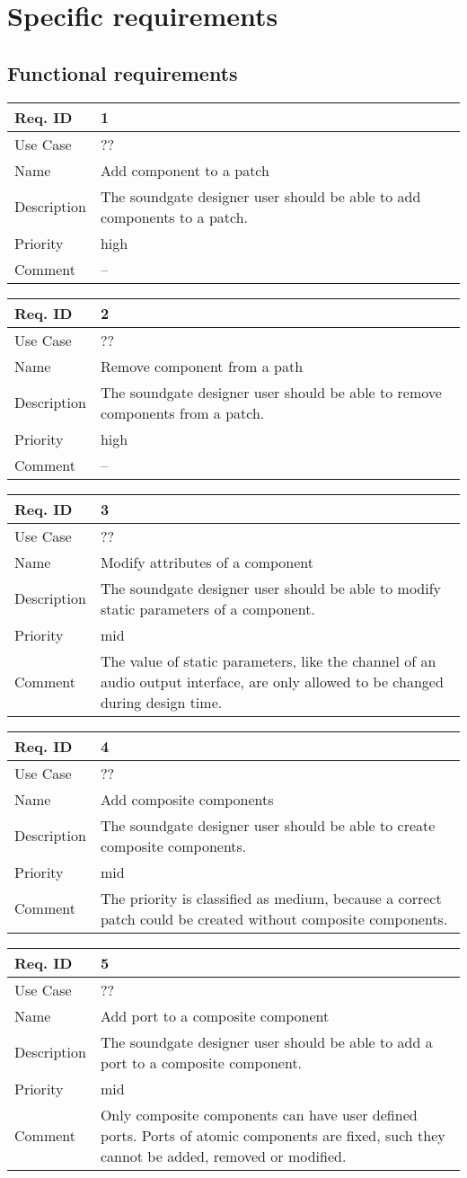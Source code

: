 \chapter{Specific requirements}

\newcommand{\funcRequirement}[6]{
\begin{center}
\begin{tabular}{|l|p{12cm}|}
\hline
Req. ID 		& #1 \\ \hline
Use Case 		& #2 \\ \hline
Name 				& #3 \\ \hline
Description & #4 \\ \hline
Priority 		& #5 \\ \hline
Comment 		& #6 \\ \hline
\end{tabular}
\end{center}
}


	\section{Functional requirements}
	

	\funcRequirement{1}
	{??}
	{Add component to a patch}
	{The soundgate designer user should be able to add components to a patch.}
	{high}
	{--}
  \funcRequirement{2}
	{??}
	{Remove component from a path}
	{The soundgate designer user should be able to remove components from a patch.}
	{high}
	{--}
  \funcRequirement{3}
	{??}
	{Modify attributes of a component}
	{The soundgate designer user should be able to modify static parameters of a component.}
	{mid}
	{The value of static parameters, like the channel of an audio output interface, are only allowed to be changed during design time.}
	
	\funcRequirement{4}
	{??}
	{Add composite components}
	{The soundgate designer user should be able to create composite components.}
	{mid}
	{The priority is classified as medium, because a correct patch could be created without composite components. }
	
	\funcRequirement{5}
	{??}
	{Add port to a composite component}
	{The soundgate designer user should be able to add a port to a composite component.}
	{mid}
	{Only composite components can have user defined ports. Ports of atomic components are fixed, such they cannot be added, removed or modified.}
	
